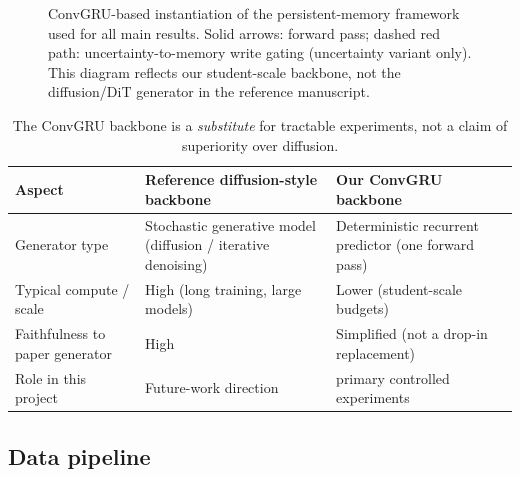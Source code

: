 \documentclass[11pt]{article}
\begin{document}
\begin{figure}[!htb]
{%
}
\caption{ConvGRU-based instantiation of the persistent-memory framework used for all main results.
Solid arrows: forward pass; dashed red path: uncertainty-to-memory write gating (uncertainty variant only).
This diagram reflects our student-scale backbone, not the diffusion/DiT generator in the reference
manuscript.}
\label{fig:architecture}
\end{figure}

\begin{table}[!htb]
\centering
\small
\begin{tabular}{p{}p{}p{}}
\toprule
Aspect & Reference diffusion-style backbone & Our ConvGRU backbone \\
\midrule
Generator type &
Stochastic generative model (diffusion / iterative denoising) &
Deterministic recurrent predictor (one forward pass) \\
Typical compute / scale &
High (long training, large models) &
Lower (student-scale budgets) \\
Faithfulness to paper generator & High & Simplified (not a drop-in replacement) \\
Role in this project &
Future-work direction & primary controlled experiments \\
\bottomrule
\end{tabular}
\caption{The ConvGRU backbone is a \emph{substitute} for tractable experiments, not a claim of superiority over diffusion.}
\label{tab:backbone-compare}
\end{table}

\subsection{Data pipeline}
\end{document}
